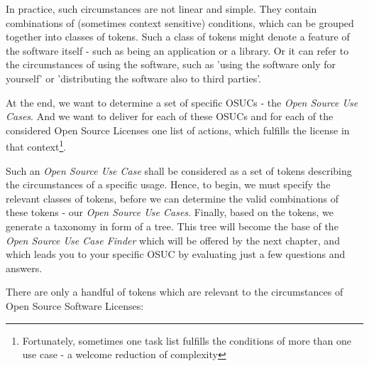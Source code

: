 In practice, such circumstances are not linear and simple. They contain
combinations of (sometimes context sensitive) conditions, which can be grouped
together into classes of tokens. Such a class of tokens might denote a feature
of the software itself - such as being an application or a library. Or it can
refer to the circumstances of using the software, such as 'using the software
only for yourself' or 'distributing the software also to third parties'.

At the end, we want to determine a set of specific OSUCs - the \emph{Open Source
Use Cases}. And we want to deliver for each of these OSUCs and for each of the
considered Open Source Licenses one list of actions, which fulfills the license
in that context\footnote{Fortunately, sometimes one task list fulfills the
conditions of more than one use case - a welcome reduction of complexity}.

Such an \emph{Open Source Use Case} shall be considered as a set of tokens
describing the circumstances of a specific usage. Hence, to begin, we must
specify the relevant classes of tokens, before we can determine the valid
combinations of these tokens - our \emph{Open Source Use Cases}. Finally, based
on the tokens, we generate a taxonomy in form of a tree. This tree will become
the base of the \emph{Open Source Use Case Finder} which will be offered by the
next chapter, and which leads you to your specific OSUC by evaluating just a few
questions and answers.

There are only a handful of tokens which are relevant to the circumstances of
Open Source Software Licenses:

